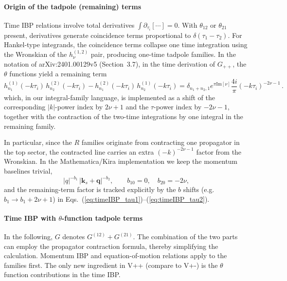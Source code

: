 \documentclass[a4paper,12pt]{article}
\def\bge{\begin{equation}}
\def\ede{\end{equation}}
\def\pd{\partial}
\def\to{\rightarrow}
\begin{document}
\paragraph{Origin of the tadpole (remaining) terms}
Time IBP relations involve total derivatives $\int \pd_{\tau_i}[\cdots]=0$. With $\theta_{12}$ or $\theta_{21}$ present, derivatives generate coincidence terms proportional to $\delta(\tau_1-\tau_2)$. For Hankel-type integrands, the coincidence terms collapse one time integration using the Wronskian of the $h^{(1,2)}_\nu$ pair, producing one-time tadpole families. In the notation of arXiv:2401.00129v5 (Section~3.7), in the time derivation of   $G_{++}$,  the $\theta$ functions yield a remaining term 
\bge
h_{n_1}^{(1)}(-k\tau_i)\,h_{n_2}^{(2)}(-k\tau_i) - h_{n_1}^{(2)}(-k\tau_i)\,h_{n_2}^{(1)}(-k\tau_i)
= \delta_{n_1+ n_2,1}e^{ \pi \text{Im}[\nu]} \frac{  4 i }{\pi}  (-k\tau_i)^{-2\nu-1} \,  .  \label{eq_propcontract}
\ede
which, in our integral-family language, is implemented as a shift of the corresponding $|k|$-power index by $2\nu+1$ and the $\tau$-power index by $-2\nu-1$,  together with the contraction of the two-time integrations by one integral in the remaining family.

In particular, since the $R$ families originate from contracting one propagator in the top sector, the contracted line carries an extra $(-k)^{-2\nu-1}$ factor from the Wronskian. In the Mathematica/Kira implementation we keep the momentum baselines trivial,
\[
|q|^{-b_1}\,|\bm k_s+\bm q|^{-b_2},
\qquad b_{10}=0, \quad b_{20}=-2\nu,
\]
and the remaining-term factor is tracked explicitly by the $b$ shifts (e.g. $b_1\to b_1+2\nu+1$) in Eqs.~(\ref{eq:timeIBP_tau1})--(\ref{eq:timeIBP_tau2}).


\paragraph{Time IBP with $\theta$-function tadpole terms}
In the following, $G$ denotes $G^{(12)}+G^{(21)}$. The combination of the two parts can employ the propagator contraction formula, thereby simplifying the calculation. Momentum IBP and equation-of-motion relations apply to the families first. The only new ingredient in V++ (compare to V+-) is the $\theta$ function contributions in the time IBP.
\end{document}
